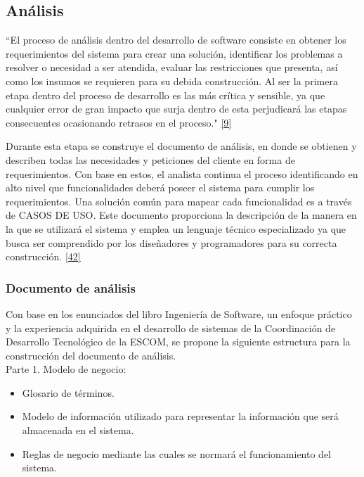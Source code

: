 \subsection{Análisis}

``El proceso de análisis dentro del desarrollo de software consiste en obtener los requerimientos del sistema para crear una solución, identificar los problemas a resolver o necesidad a ser atendida, evaluar las restricciones que presenta, así como los insumos se requieren para su debida construcción.
Al ser la primera etapa dentro del proceso de desarrollo es las más crítica y sensible, ya que cualquier error de gran impacto que surja dentro de esta perjudicará las etapas consecuentes ocasionando retrasos en el proceso." \hyperlink{b09}{[9]} 

\bigskip

Durante esta etapa se construye el documento de análisis, en donde se obtienen y describen todas las necesidades y peticiones del cliente en forma de requerimientos. Con base en estos, el analista continua el proceso identificando en alto nivel que funcionalidades deberá poseer el sistema para cumplir los requerimientos. Una solución común para mapear cada funcionalidad es a través de CASOS DE USO. Este documento proporciona la descripción de la manera en la que se utilizará el sistema y emplea un lenguaje técnico especializado ya que busca ser comprendido por los diseñadores y programadores para su correcta construcción. \hyperlink{b42}{[42]}


\subsubsection{Documento de análisis}

Con base en los enunciados del libro Ingeniería de Software, un enfoque práctico y la experiencia adquirida en el desarrollo de sistemas de la Coordinación de Desarrollo Tecnológico de la ESCOM, se propone la siguiente estructura para la construcción del documento de análisis.\\

Parte 1. Modelo de negocio:
\begin{itemize}
	\item Glosario de términos.
	\item Modelo de información utilizado para representar la información que será almacenada en el sistema.
	\item Reglas de negocio mediante las cuales se normará el funcionamiento del sistema.
\end{itemize}

